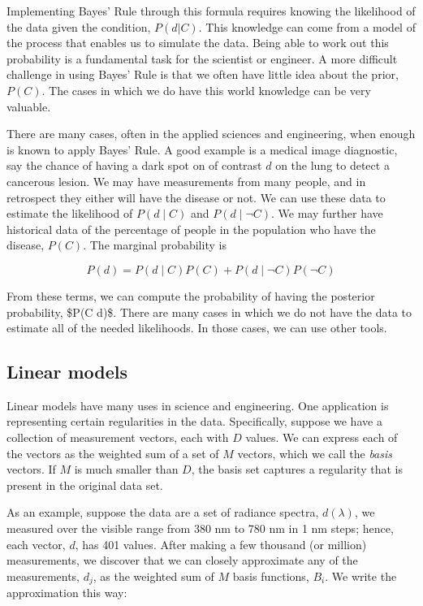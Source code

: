 \documentclass[
  letterpaper,
]{book}
\begin{document}
Implementing Bayes' Rule through this formula requires knowing the
likelihood of the data given the condition, \(P(d|C)\). This knowledge
can come from a model of the process that enables us to simulate the
data. Being able to work out this probability is a fundamental task for
the scientist or engineer. A more difficult challenge in using Bayes'
Rule is that we often have little idea about the prior, \(P(C)\). The
cases in which we do have this world knowledge can be very valuable.

There are many cases, often in the applied sciences and engineering,
when enough is known to apply Bayes' Rule. A good example is a medical
image diagnostic, say the chance of having a dark spot on of contrast
\(d\) on the lung to detect a cancerous lesion. We may have measurements
from many people, and in retrospect they either will have the disease or
not. We can use these data to estimate the likelihood of \(P(d \mid C)\)
and \(P(d \mid \neg C)\). We may further have historical data of the
percentage of people in the population who have the disease, \(P(C)\).
The marginal probability is

\[
P(d) = P(d \mid C) P(C) + P(d \mid \neg C) P(\neg C)
\]

From these terms, we can compute the probability of having the posterior
probability, \$P(C \mid d)\$. There are many cases in which we do not
have the data to estimate all of the needed likelihoods. In those cases,
we can use other tools.

\subsection{Linear models}\label{sec-linear-models}

Linear models have many uses in science and engineering. One application
is representing certain regularities in the data. Specifically, suppose
we have a collection of measurement vectors, each with \(D\) values. We
can express each of the vectors as the weighted sum of a set of \(M\)
vectors, which we call the \emph{basis} vectors. If \(M\) is much
smaller than \(D\), the basis set captures a regularity that is present
in the original data set.

As an example, suppose the data are a set of radiance spectra,
\(d(\lambda)\), we measured over the visible range from 380 nm to 780 nm
in 1 nm steps; hence, each vector, \(d\), has 401 values. After making a
few thousand (or million) measurements, we discover that we can closely
approximate any of the measurements, \(d_j\), as the weighted sum of
\(M\) basis functions, \(B_i\). We write the approximation this way:
\end{document}
